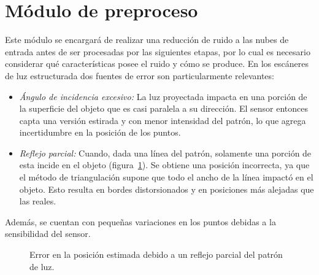 \section{Módulo de preproceso}
Este módulo se encargará de realizar una reducción de ruido a las nubes de entrada
antes de ser procesadas por las siguientes etapas,
por lo cual es necesario considerar
qué características posee el ruido y cómo se produce.
En los escáneres de luz estructurada dos fuentes de error son particularmente relevantes:
\begin{itemize}
	\item \emph{Ángulo de incidencia excesivo:\/}
		La luz proyectada impacta en una porción de la superficie del objeto
		que es casi paralela a su dirección.
		El sensor entonces capta una versión estirada y con menor intensidad del patrón, lo que 
		agrega incertidumbre en la posición de los puntos.
	\item \emph{Reflejo parcial:\/}
		Cuando, dada una línea del patrón, solamente una porción de esta incide en el objeto (figura~\ref{fig:error_adquisicion}).
		Se obtiene una posición incorrecta, ya que el método de triangulación
		supone que todo el ancho de la línea impactó en el objeto.
		Esto resulta en bordes distorsionados y en posiciones más alejadas que las reales.\cite{Turk:1994:ZPM:192161.192241}
\end{itemize}
Además, se cuentan con pequeñas variaciones en los puntos debidas a la sensibilidad del sensor.

\begin{figure}
	\caption{\label{fig:error_adquisicion}Error en la posición estimada debido a un reflejo parcial del patrón de luz.}
\end{figure}

